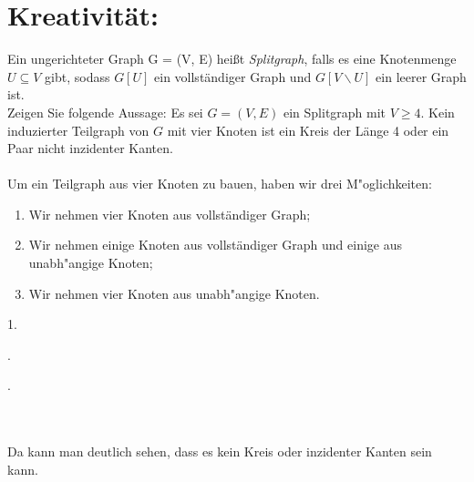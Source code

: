     \section*{Kreativität:}
    Ein ungerichteter Graph G = (V, E) heißt \textit{Splitgraph}, falls es eine Knotenmenge $U\subseteq V$ gibt,
	sodass $G[U]$ ein vollständiger Graph und $G[V\backslash U]$ ein leerer Graph ist.\\
	Zeigen Sie folgende Aussage:
	Es sei $G = (V, E)$ ein Splitgraph mit $V\geq 4$. Kein induzierter Teilgraph von $G$
	mit vier Knoten ist ein Kreis der Länge 4 oder ein Paar nicht inzidenter Kanten.\\\\
	Um ein Teilgraph aus vier Knoten zu bauen, haben wir drei M"oglichkeiten:
	\begin{enumerate}
		\item Wir nehmen vier Knoten aus vollständiger Graph;
		\item Wir nehmen einige Knoten aus vollständiger Graph und einige aus unabh"angige Knoten;
		\item Wir nehmen vier Knoten aus unabh"angige Knoten.
	\end{enumerate}
	1. 
    .
    .
    \\\\
    Da kann man deutlich sehen, dass es kein Kreis oder inzidenter Kanten sein kann. 
